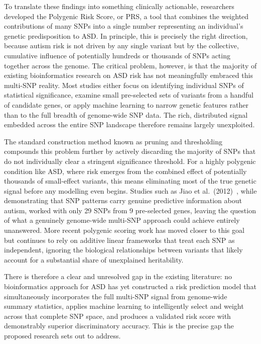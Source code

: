 To translate these findings into something clinically actionable,
researchers developed the Polygenic Risk Score, or PRS, a tool that
combines the weighted contributions of many SNPs into a single number
representing an individual's genetic predisposition to ASD. In
principle, this is precisely the right direction, because autism risk
is not driven by any single variant but by the collective, cumulative
influence of potentially hundreds or thousands of SNPs acting together
across the genome. The critical problem, however, is that the majority
of existing bioinformatics research on ASD risk has not meaningfully
embraced this multi-SNP reality. Most studies either focus on
identifying individual SNPs of statistical significance, examine small
pre-selected sets of variants from a handful of candidate genes, or
apply machine learning to narrow genetic features rather than to the
full breadth of genome-wide SNP data. The rich, distributed signal
embedded across the entire SNP landscape therefore remains largely
unexploited.

The standard construction method known as pruning and thresholding
compounds this problem further by actively discarding the majority of
SNPs that do not individually clear a stringent significance
threshold. For a highly polygenic condition like ASD, where risk
emerges from the combined effect of potentially thousands of
small-effect variants, this means eliminating most of the true genetic
signal before any modelling even begins. Studies such as Jiao et al.\
(2012)~\cite{jiao2012}, while demonstrating that SNP patterns carry
genuine predictive information about autism, worked with only 29 SNPs
from 9 pre-selected genes, leaving the question of what a genuinely
genome-wide multi-SNP approach could achieve entirely unanswered. More
recent polygenic scoring work has moved closer to this goal but
continues to rely on additive linear frameworks that treat each SNP as
independent, ignoring the biological relationships between variants
that likely account for a substantial share of unexplained heritability.

There is therefore a clear and unresolved gap in the existing
literature: no bioinformatics approach for ASD has yet constructed a
risk prediction model that simultaneously incorporates the full
multi-SNP signal from genome-wide summary statistics, applies machine
learning to intelligently select and weight across that complete SNP
space, and produces a validated risk score with demonstrably superior
discriminatory accuracy. This is the precise gap the proposed research
sets out to address.
